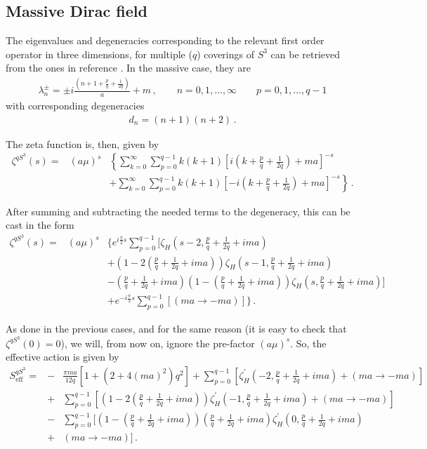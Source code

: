 \documentclass[12pt,a4paper]{article}
\newcommand{\beq}{\begin{eqnarray}}
\newcommand{\eeq}{\end{eqnarray}}
\newcommand{\nn}{\nonumber}
\numberwithin{equation}{section}
\begin{document}
\subsection{Massive Dirac field}

The eigenvalues and degeneracies corresponding to the relevant first order operator in three dimensions, for multiple ($q$) coverings of $S^3$ can be retrieved from the ones in reference \cite{kleRenyi}. In the massive case, they are
\beq
\lambda_n^{\pm}= \pm i\frac{(n+1+\frac{p}{q}+\frac{1}{2q})}{a} + m\,, \qquad n= 0,1,\ldots , \infty \qquad p= 0,1,\ldots , q-1
\eeq
with corresponding degeneracies
\beq
d_n= (n+1)(n+2)\,.
\eeq

The zeta function is, then, given by
\beq
\zeta^{qS^3}(s)=& (a \mu)^{s} & \left\{\sum_{k=0}^{\infty}\sum_{p=0}^{q-1} k(k+1) \left[i\left(k + \frac{p}{q}+\frac{1}{2q}\right)+ma\right]^{-s}\right. \nn \\
&& + \left. \sum_{k=0}^{\infty}\sum_{p=0}^{q-1} k(k+1) \left[-i\left(k + \frac{p}{q}+\frac{1}{2q}\right)+ma\right]^{-s}\right\}\,.
\eeq

After summing and subtracting the needed terms to the degeneracy, this can be cast in the form
\beq
\zeta^{qS^3}(s)=&(a \mu)^{s} & \Bigg\{e^{i\frac{\pi}{2} s}\sum_{p=0}^{q-1} \Bigg[{\zeta}_H \left(s-2,\frac{p}{q}+\frac{1}{2q}+ima\right)\nn\\
  && +\left(1-2\left(\frac{p}{q}+\frac{1}{2q}+ i ma\right)\right){\zeta}_H \left(s-1,\frac{p}{q}+\frac{1}{2q}+ima\right)\nn \\
&& - \left(\frac{p}{q}+\frac{1}{2q}+ i ma\right)\left(1-\left(\frac{p}{q}+\frac{1}{2q}+ i ma\right)\right){\zeta}_H \left(s,\frac{p}{q}+\frac{1}{2q}+ima\right)\Bigg]\nn\\
&& +  e^{-i\frac{\pi}{2} s}\sum_{p=0}^{q-1} \left[ (ma\rightarrow -ma)\right]\Bigg\}
\,.
\label{zetaqdirac}\eeq

As done in the previous cases, and for the same reason (it is easy to check that $\zeta^{qS^3}(0)=0$), we will, from now on, ignore the pre-factor $(a \mu)^{s}$. So, the effective action is given by
\beq
S_{\mathrm{eff}}^{qS^3}=&-&\frac{\pi ma}{12q}\left[1+(2+4(ma)^2)q^2\right]+\sum_{p=0}^{q-1} \left[{\zeta}^{\prime}_H \left(-2,\frac{p}{q}+\frac{1}{2q}+ima\right)+(ma\rightarrow -ma)\right]\nn \\
&+& \sum_{p=0}^{q-1} \left[\left(1-2\left(\frac{p}{q}+\frac{1}{2q}+ i ma\right)\right){\zeta}^{\prime}_H \left(-1,\frac{p}{q}+\frac{1}{2q}+ima\right)+(ma\rightarrow -ma)\right]\nn \\
&-& \sum_{p=0}^{q-1} \Bigg[\left(1-\left(\frac{p}{q}+\frac{1}{2q}+ i ma\right)\right)\left(\frac{p}{q}+\frac{1}{2q}+ i ma\right){\zeta}^{\prime}_H \left(0,\frac{p}{q}+\frac{1}{2q}+ima\right)\nn\\
&+&(ma\rightarrow -ma) \Bigg]\,.
\label{qs3}
\eeq
\end{document}
